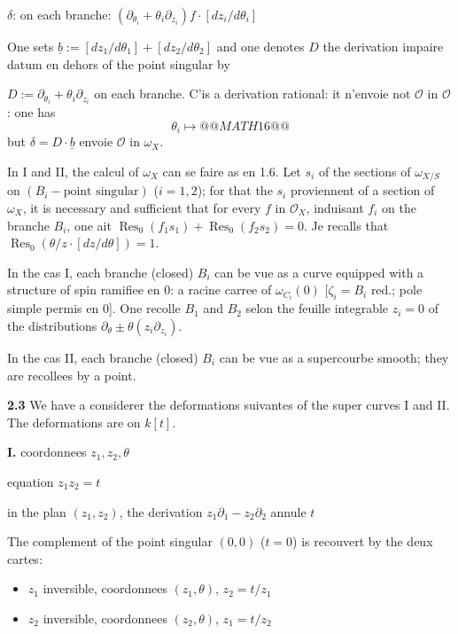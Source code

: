 \documentclass[11pt,a4paper]{article}
\theoremstyle{plain}
\theoremstyle{definition}
\DeclareMathOperator{\Res}{Res}
\begin{document}
$\delta$: on each branche: $(\partial_{\theta_i} + \theta_i\partial_{z_i})f \cdot [dz_i/d\theta_i]$

One sets $\underline{b} := [dz_1/d\theta_1] + [dz_2/d\theta_2]$ and one denotes $D$ the derivation impaire datum en dehors of the point singular by

\newpage

$D := \partial_{\theta_i} + \theta_i\partial_{z_i}$ on each branche. C'is a derivation rational: it n'envoie not $\mathcal{O}$ in $\mathcal{O}$: one has
\[
\theta_i \longmapsto @@MATH16@@
\]
but $\delta = D \cdot \underline{b}$ envoie $\mathcal{O}$ in $\omega_X$.

In I and II, the calcul of $\omega_X$ can se faire as en 1.6. Let $s_i$ of the sections of $\omega_{X/S}$ on $(B_i - \text{point singular})$ ($i = 1,2$); for that the $s_i$ proviennent of a section of $\omega_X$, it is necessary and sufficient that for every $f$ in $\mathcal{O}_X$, induisant $f_i$ on the branche $B_i$, one ait $\Res_0(f_1 s_1) + \Res_0(f_2 s_2) = 0$. Je recalls that $\Res_0(\theta/z \cdot [dz/d\theta]) = 1$.

In the cas I, each branche (closed) $B_i$ can be vue as a curve equipped with a structure of spin ramifiee en 0: a racine carree of $\omega_{C_i}(0)$ [$\zeta_i = B_i$ red.; pole simple permis en 0]. One recolle $B_1$ and $B_2$ selon the feuille integrable $z_i = 0$ of the distributions $\partial_\theta \pm \theta(z_i\partial_{z_i})$.

In the cas II, each branche (closed) $B_i$ can be vue as a supercourbe smooth; they are recollees by a point.

\newpage

\noindent \textbf{2.3} We have a considerer the deformations suivantes of the super curves I and II. The deformations are on $k[t]$.

\medskip

\noindent \textbf{I.} coordonnees $z_1, z_2, \theta$

equation $z_1 z_2 = t$ \hfill \begin{minipage}{5cm}\small in the plan $(z_1,z_2)$, the derivation $z_1\partial_1 - z_2\partial_2$ annule $t$\end{minipage}

The complement of the point singular $(0,0)$ ($t=0$) is recouvert by the deux cartes:
\begin{itemize}
\item[(1)] $z_1$ inversible, coordonnees $(z_1, \theta)$, $z_2 = t/z_1$
\item[(2)] $z_2$ inversible, coordonnees $(z_2, \theta)$, $z_1 = t/z_2$
\end{itemize}
\end{document}
